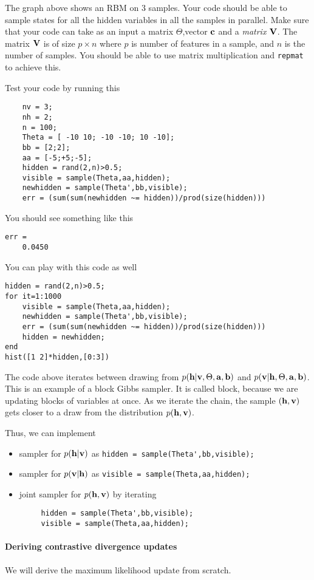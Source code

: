 \documentclass{article}
\begin{document}
The graph above shows an RBM on 3 samples. Your code should be able to sample states for all the hidden variables in all the samples in parallel.
Make sure that your code can take as an input a matrix $\Theta$,vector $\mathbf{c}$ and a {\em matrix} $\mathbf{V}$. The matrix $\mathbf{V}$ is of size $p \times n$ where
$p$ is number of features in a sample, and $n$ is the number of samples. You should be able to use matrix multiplication and \verb|repmat| to achieve this.

Test your code by running this
\begin{verbatim}
    nv = 3;
    nh = 2;
    n = 100;
    Theta = [ -10 10; -10 -10; 10 -10];
    bb = [2;2];
    aa = [-5;+5;-5];
    hidden = rand(2,n)>0.5;
    visible = sample(Theta,aa,hidden);
    newhidden = sample(Theta',bb,visible);
    err = (sum(sum(newhidden ~= hidden))/prod(size(hidden)))
\end{verbatim}
You should see something like this
\begin{verbatim}
err =
    0.0450
\end{verbatim}
You can play with this code as well
\begin{verbatim}
hidden = rand(2,n)>0.5;
for it=1:1000
    visible = sample(Theta,aa,hidden);
    newhidden = sample(Theta',bb,visible);
    err = (sum(sum(newhidden ~= hidden))/prod(size(hidden)))
    hidden = newhidden;
end
hist([1 2]*hidden,[0:3])
\end{verbatim}
The code above iterates between drawing from $p(\mathbf{h}|\mathbf{v},\Theta,\mathbf{a},\mathbf{b})$ and $p(\mathbf{v}|\mathbf{h},\Theta,\mathbf{a},\mathbf{b})$.
This is an example of a block Gibbs sampler. It is called block, because we are updating blocks of variables at once.
As we iterate the chain, the sample $(\mathbf{h},\mathbf{v})$ gets closer to a draw from the distribution $p(\mathbf{h},\mathbf{v})$.

Thus, we can implement
\begin{itemize}
\item sampler for $p(\mathbf{h}|\mathbf{v})$  as  \verb|hidden = sample(Theta',bb,visible);|
\item sampler for $p(\mathbf{v}|\mathbf{h})$ as  \verb|visible = sample(Theta,aa,hidden);|
\item joint sampler for $p(\mathbf{h},\mathbf{v})$ by iterating
\begin{verbatim}
     hidden = sample(Theta',bb,visible);
     visible = sample(Theta,aa,hidden);
\end{verbatim}
\end{itemize}
\newproblem{2pt} \paragraph{Deriving contrastive divergence updates}
We will derive the maximum likelihood update from scratch.
\end{document}
